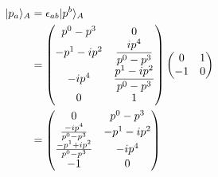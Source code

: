 \documentclass[12pt]{article}
\newcommand{\aket}[1]{|#1\rangle}
\begin{document}
\begin{align}
    \aket{p_a}_A&=\epsilon_{ab}\aket{p^b}_A\notag \\
    &=\begin{pmatrix}
        p^0 - p^3 & 0 \\
        -p^1 - ip^2 & \dfrac{ip^4}{p^0-p^3} \\
        -ip^4 & \dfrac{p^1 - ip^2}{p^0 - p^3} \\
        0 & 1
    \end{pmatrix}\begin{pmatrix}
        0& 1\\
        -1 & 0 
    \end{pmatrix}\notag \\
    &=\begin{pmatrix}
        0 & p^0-p^3\\
        \frac{-ip^4}{p^0-p^3} & -p^1-ip^2\\
        \frac{-p^1+ip^2}{p^0-p^3} & -ip^4\\
        -1 & 0
    \end{pmatrix}
\end{align}
\end{document}
